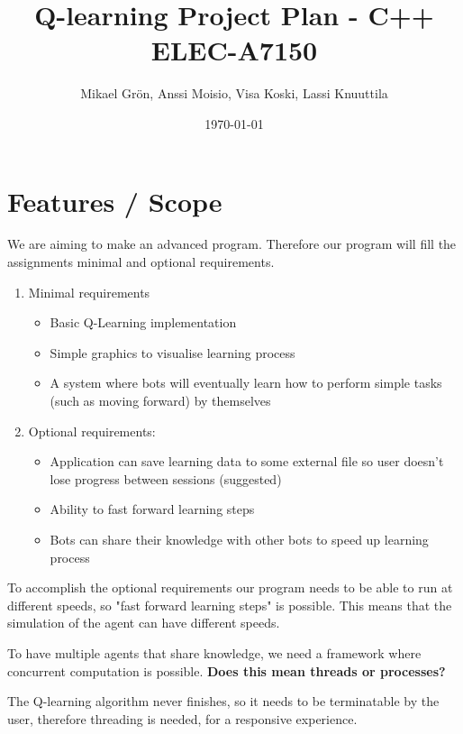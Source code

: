 \documentclass{article}
\author{Mikael Grön, Anssi Moisio, Visa Koski, Lassi Knuuttila}
\title{Q-learning Project Plan - C++ ELEC-A7150}
\date{\today}
\begin{document}
\maketitle

\tableofcontents
\newpage

\section{Features / Scope}
We are aiming to make an advanced program. Therefore our program will fill
the assignments minimal and optional requirements.

\begin{enumerate}
\item Minimal requirements
    \begin{itemize}
    \item Basic Q-Learning implementation
    \item Simple graphics to visualise learning process
    \item A system where bots will eventually learn how to perform simple
    tasks (such as moving forward) by themselves
    \end{itemize}
\item Optional requirements:
    \begin{itemize}
    \item Application can save learning data to some external file so user
    doesn't lose progress between sessions (suggested)
    \item Ability to fast forward learning steps
    \item Bots can share their knowledge with other bots to speed up learning
    process
    \end{itemize}
\end{enumerate}

To accomplish the optional requirements our program needs to be able to run
at different speeds, so "fast forward learning steps" is possible. This
means that the simulation of the agent can have different speeds.

To have multiple agents that share knowledge, we need a framework where
concurrent computation is possible. \textbf{Does this mean threads or
processes?}

The Q-learning algorithm never finishes, so it needs to be terminatable
by the user, therefore threading is needed, for a responsive experience.
\end{document}
